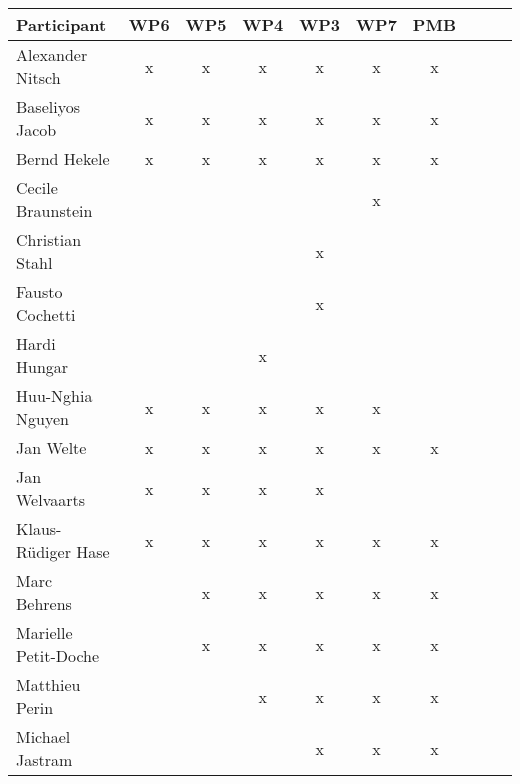 \documentclass[a4paper, 11pt]{article}
\begin{document}
\begin{tabular}{|l|c|c|c||c|c|c||c|c|c|}
\hline
\textbf{Participant} & \textbf{WP6} &  \textbf{WP5} & \textbf{WP4}&  \textbf{WP3} & \textbf{WP7}&  \textbf{PMB} \\\hline
Alexander Nitsch     & x & x & x & x & x & x \\\hline  
Baseliyos Jacob      & x & x & x & x & x & x \\\hline 
Bernd Hekele         & x & x & x & x & x & x \\\hline
Cecile Braunstein    &   &   &   &   & x &   \\\hline
Christian Stahl      &   &   &   & x &   &   \\\hline
Fausto Cochetti      &   &   &   & x &   &   \\\hline
Hardi Hungar         &   &   & x &   &   &   \\\hline
Huu-Nghia Nguyen     & x & x & x & x & x &   \\\hline
Jan Welte            & x & x & x & x & x & x \\\hline
Jan Welvaarts        & x & x & x & x &   &   \\\hline
Klaus-R\"udiger Hase & x & x & x & x & x & x \\\hline
Marc Behrens         &   & x & x & x & x & x \\\hline
Marielle Petit-Doche &   & x & x & x & x & x \\\hline
Matthieu Perin       &   &   & x & x & x & x \\\hline
Michael Jastram      &   &   &   & x & x & x \\\hline

\end{tabular}
\end{document}
